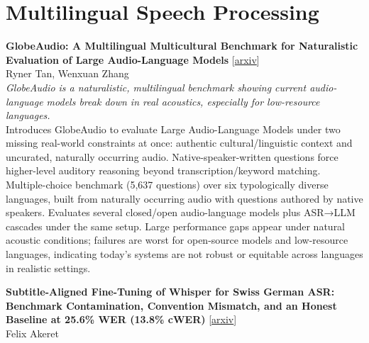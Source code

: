 \documentclass[12pt,letterpaper]{article}
\begin{document}
\medskip


\section*{Multilingual Speech Processing}

{\small\textbf{GlobeAudio: A Multilingual Multicultural Benchmark for Naturalistic Evaluation of Large Audio-Language Models}} {\scriptsize[\href{https://arxiv.org/abs/2606.08194}{arxiv}]}\\
{\scriptsize Ryner Tan, Wenxuan Zhang}\\

{\small\textit{GlobeAudio is a naturalistic, multilingual benchmark showing current audio-language models break down in real acoustics, especially for low-resource languages.}}\\[1pt]
{\footnotesize Introduces GlobeAudio to evaluate Large Audio-Language Models under two missing real-world constraints at once: authentic cultural/linguistic context and uncurated, naturally occurring audio. Native-speaker-written questions force higher-level auditory reasoning beyond transcription/keyword matching. Multiple-choice benchmark (5,637 questions) over six typologically diverse languages, built from naturally occurring audio with questions authored by native speakers. Evaluates several closed/open audio-language models plus ASR→LLM cascades under the same setup. Large performance gaps appear under natural acoustic conditions; failures are worst for open-source models and low-resource languages, indicating today's systems are not robust or equitable across languages in realistic settings.}

\medskip

{\small\textbf{Subtitle-Aligned Fine-Tuning of Whisper for Swiss German ASR: Benchmark Contamination, Convention Mismatch, and an Honest Baseline at 25.6\% WER (13.8\% cWER)}} {\scriptsize[\href{https://arxiv.org/abs/2606.07608}{arxiv}]}\\
{\scriptsize Felix Akeret}\\
\end{document}
